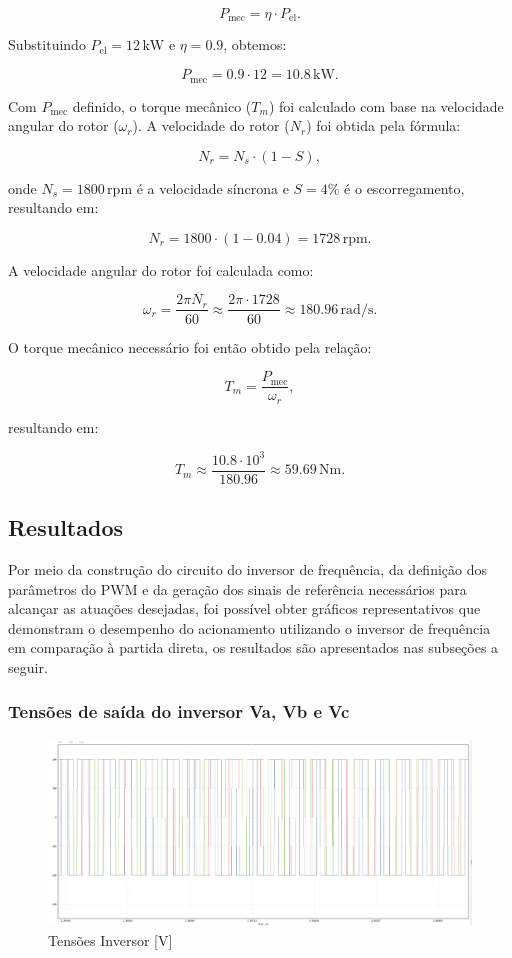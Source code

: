 \documentclass[a4paper, 11pt]{article}
\begin{document}
\[
P_{\text{mec}} = \eta \cdot P_{\text{el}}.
\]

Substituindo \(P_{\text{el}} = 12\,\mathrm{kW}\) e \(\eta = 0.9\), obtemos:

\[
P_{\text{mec}} = 0.9 \cdot 12 = 10.8\,\mathrm{kW}.
\]

Com \(P_{\text{mec}}\) definido, o torque mecânico (\(T_m\)) foi calculado com base na velocidade angular do rotor (\(\omega_r\)). A velocidade do rotor (\(N_r\)) foi obtida pela fórmula:

\[
N_r = N_s \cdot (1 - S),
\]

onde \(N_s = 1800\,\mathrm{rpm}\) é a velocidade síncrona e \(S = 4\%\) é o escorregamento, resultando em:

\[
N_r = 1800 \cdot (1 - 0.04) = 1728\,\mathrm{rpm}.
\]

A velocidade angular do rotor foi calculada como:

\[
\omega_r = \frac{2\pi N_r}{60} \approx \frac{2\pi \cdot 1728}{60} \approx 180.96\,\mathrm{rad/s}.
\]

O torque mecânico necessário foi então obtido pela relação:

\[
T_m = \frac{P_{\text{mec}}}{\omega_r},
\]

resultando em:

\[
T_m \approx \frac{10.8 \cdot 10^3}{180.96} \approx 59.69\,\mathrm{Nm}.
\]

\subsection{Resultados}

Por meio da construção do circuito do inversor de frequência, da definição dos parâmetros do PWM e da geração dos sinais de referência necessários para alcançar as atuações desejadas, foi possível obter gráficos representativos que demonstram o desempenho do acionamento utilizando o inversor de frequência em comparação à partida direta, os resultados são apresentados nas subseções a seguir.

\subsubsection{Tensões de saída do inversor Va, Vb e Vc}

\begin{figure}[H]
    \centering
    \includegraphics[width=1\linewidth]{correcao_images/tensoes_inversor.png}
    \caption{Tensões Inversor [V]}
    \label{fig:tensoes-inversor}
\end{figure}
\end{document}
